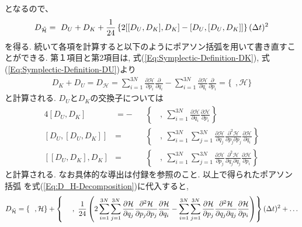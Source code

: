 となるので、
\begin{align}
  D_{\Tilde{\mathcal{H}}}
  =~
  D_{U} + D_{K}
  +
  \frac{1}{24}
  \left\{
      2[[D_{U}, D_{K}], D_{K}]
      -[D_{U}, [D_{U}, D_{K}]]
  \right\}
  (\Delta t)^{2}
  \label{Eq:D_H-Decomposition}
\end{align}
を得る. 続いて各項を計算すると以下のようにポアソン括弧を用いて書き直すことができる.
第１項目と第2項目は, 式(\ref{Eq:Symplectic-Definition-DK}), 式(\ref{Eq:Symplectic-Definition-DU})より
\begin{align}
  D_{K} + D_{U}
  =
  D_{\mathcal{H}}
  =
  \sum_{i=1}^{3N}
  \frac{\partial \mathcal{H}}{\partial p_{i}}
  \frac{\partial}{\partial q_{i}}
  -
  \sum_{i=1}^{3N}
  \frac{\partial \mathcal{H}}{\partial q_{i}}
  \frac{\partial}{\partial p_{i}}
  =
  \{~~, \mathcal{H}\}
  \label{Eq:PoissonBracket-DK+DU}
\end{align}
と計算される. $D_{U}$と$D_{K}$の交換子については
\begin{alignat}{4}
  [D_{U}, D_{K}]
  &=
  -&&
  \left\{
    ~~~~,~
    \sum_{i=1}^{3N}
    \frac{\partial \mathcal{H}}{\partial q_{i}}
    \frac{\partial \mathcal{H}}{\partial p_{i}}
  \right\}
  \label{Eq:PoissonBracket-DU-DK}
  \\
  [D_{U}, [D_{U}, D_{K}]]
  &=&&
  \left\{
    ~~~~,~
    \sum_{i=1}^{3N} \sum_{j=1}^{3N}
    \frac{\partial \mathcal{H}}{\partial q_{j}}
    \frac{\partial^{2} \mathcal{H}}{\partial p_{j} \partial p_{j}}
    \frac{\partial \mathcal{H}}{\partial q_{i}}
  \right\}
  \label{Eq:PoissonBracket-DU-DU-DK}
  \\
  [[D_{U}, D_{K}], D_{K}]
  &=&&
  \left\{
    ~~~~,~
    \sum_{i=1}^{3N} \sum_{j=1}^{3N}
    \frac{\partial \mathcal{H}}{\partial p_{j}}
    \frac{\partial^{2} \mathcal{H}}{\partial q_{j} \partial q_{j}}
    \frac{\partial \mathcal{H}}{\partial p_{i}}
  \right\}
  \label{Eq:PoissonBracket-DU-DK-DK}
\end{alignat}
と計算される. なお具体的な導出は付録を参照のこと.
以上で得られたポアソン括弧
を式(\ref{Eq:D_H-Decomposition})に代入すると,
\begin{align}
  D_{\Tilde{\mathcal{H}}}
  =
  \{~~, \mathcal{H}\}
  +
  \left\{
    ~~~~,~
    \frac{1}{24}
    \left(
      2
      \sum_{i=1}^{3N} \sum_{j=1}^{3N}
      \frac{\partial \mathcal{H}}{\partial q_{j}}
      \frac{\partial^{2} \mathcal{H}}{\partial p_{j} \partial p_{j}}
      \frac{\partial \mathcal{H}}{\partial q_{i}}
    -
      \sum_{i=1}^{3N} \sum_{j=1}^{3N}
      \frac{\partial \mathcal{H}}{\partial p_{j}}
      \frac{\partial^{2} \mathcal{H}}{\partial q_{j} \partial q_{j}}
      \frac{\partial \mathcal{H}}{\partial p_{i}}
    \right)
  \right\}
  (\Delta t)^{2}
  +
  \ldots
\end{align}
